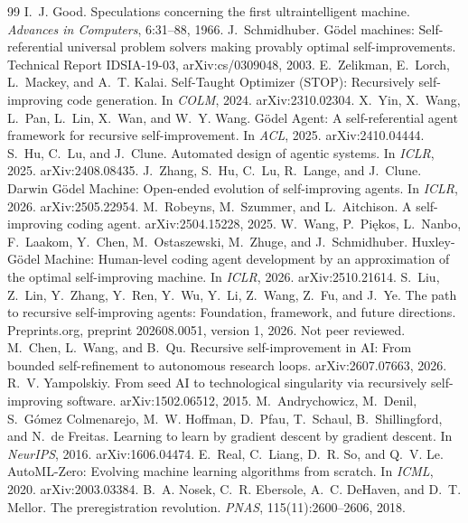 \documentclass[11pt]{article}
\begin{document}
\begin{thebibliography}{99}\small
{} I.~J. Good. Speculations concerning the first ultraintelligent machine. \emph{Advances in Computers}, 6:31--88, 1966.
 J.~Schmidhuber. G\"odel machines: Self-referential universal problem solvers making provably optimal self-improvements. Technical Report IDSIA-19-03, arXiv:cs/0309048, 2003.
 E.~Zelikman, E.~Lorch, L.~Mackey, and A.~T. Kalai. Self-Taught Optimizer (STOP): Recursively self-improving code generation. In \emph{COLM}, 2024. arXiv:2310.02304.
 X.~Yin, X.~Wang, L.~Pan, L.~Lin, X.~Wan, and W.~Y. Wang. G\"odel Agent: A self-referential agent framework for recursive self-improvement. In \emph{ACL}, 2025. arXiv:2410.04444.
 S.~Hu, C.~Lu, and J.~Clune. Automated design of agentic systems. In \emph{ICLR}, 2025. arXiv:2408.08435.
 J.~Zhang, S.~Hu, C.~Lu, R.~Lange, and J.~Clune. Darwin G\"odel Machine: Open-ended evolution of self-improving agents. In \emph{ICLR}, 2026. arXiv:2505.22954.
 M.~Robeyns, M.~Szummer, and L.~Aitchison. A self-improving coding agent. arXiv:2504.15228, 2025.
 W.~Wang, P.~Pi\k{e}kos, L.~Nanbo, F.~Laakom, Y.~Chen, M.~Ostaszewski, M.~Zhuge, and J.~Schmidhuber. Huxley-G\"odel Machine: Human-level coding agent development by an approximation of the optimal self-improving machine. In \emph{ICLR}, 2026. arXiv:2510.21614.
 S.~Liu, Z.~Lin, Y.~Zhang, Y.~Ren, Y.~Wu, Y.~Li, Z.~Wang, Z.~Fu, and J.~Ye. The path to recursive self-improving agents: Foundation, framework, and future directions. Preprints.org, preprint 202608.0051, version 1, 2026. Not peer reviewed.
 M.~Chen, L.~Wang, and B.~Qu. Recursive self-improvement in AI: From bounded self-refinement to autonomous research loops. arXiv:2607.07663, 2026.
 R.~V. Yampolskiy. From seed AI to technological singularity via recursively self-improving software. arXiv:1502.06512, 2015.
 M.~Andrychowicz, M.~Denil, S.~G\'omez Colmenarejo, M.~W. Hoffman, D.~Pfau, T.~Schaul, B.~Shillingford, and N.~de Freitas. Learning to learn by gradient descent by gradient descent. In \emph{NeurIPS}, 2016. arXiv:1606.04474.
 E.~Real, C.~Liang, D.~R. So, and Q.~V. Le. AutoML-Zero: Evolving machine learning algorithms from scratch. In \emph{ICML}, 2020. arXiv:2003.03384.
 B.~A. Nosek, C.~R. Ebersole, A.~C. DeHaven, and D.~T. Mellor. The preregistration revolution. \emph{PNAS}, 115(11):2600--2606, 2018.

\end{thebibliography}
\end{document}
